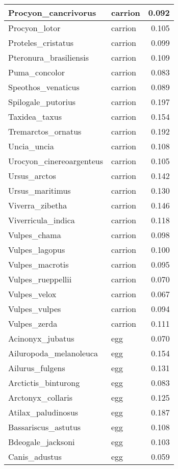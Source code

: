 \begin{table}
\begin{tabular}[t]{l|l|r}
\hline
Procyon\_cancrivorus & carrion & 0.092\\
\hline
Procyon\_lotor & carrion & 0.105\\
\hline
Proteles\_cristatus & carrion & 0.099\\
\hline
Pteronura\_brasiliensis & carrion & 0.109\\
\hline
Puma\_concolor & carrion & 0.083\\
\hline
Speothos\_venaticus & carrion & 0.089\\
\hline
Spilogale\_putorius & carrion & 0.197\\
\hline
Taxidea\_taxus & carrion & 0.154\\
\hline
Tremarctos\_ornatus & carrion & 0.192\\
\hline
Uncia\_uncia & carrion & 0.108\\
\hline
Urocyon\_cinereoargenteus & carrion & 0.105\\
\hline
Ursus\_arctos & carrion & 0.142\\
\hline
Ursus\_maritimus & carrion & 0.130\\
\hline
Viverra\_zibetha & carrion & 0.146\\
\hline
Viverricula\_indica & carrion & 0.118\\
\hline
Vulpes\_chama & carrion & 0.098\\
\hline
Vulpes\_lagopus & carrion & 0.100\\
\hline
Vulpes\_macrotis & carrion & 0.095\\
\hline
Vulpes\_rueppellii & carrion & 0.070\\
\hline
Vulpes\_velox & carrion & 0.067\\
\hline
Vulpes\_vulpes & carrion & 0.094\\
\hline
Vulpes\_zerda & carrion & 0.111\\
\hline
Acinonyx\_jubatus & egg & 0.070\\
\hline
Ailuropoda\_melanoleuca & egg & 0.154\\
\hline
Ailurus\_fulgens & egg & 0.131\\
\hline
Arctictis\_binturong & egg & 0.083\\
\hline
Arctonyx\_collaris & egg & 0.125\\
\hline
Atilax\_paludinosus & egg & 0.187\\
\hline
Bassariscus\_astutus & egg & 0.108\\
\hline
Bdeogale\_jacksoni & egg & 0.103\\
\hline
Canis\_adustus & egg & 0.059\\

\end{tabular}
\end{table}
